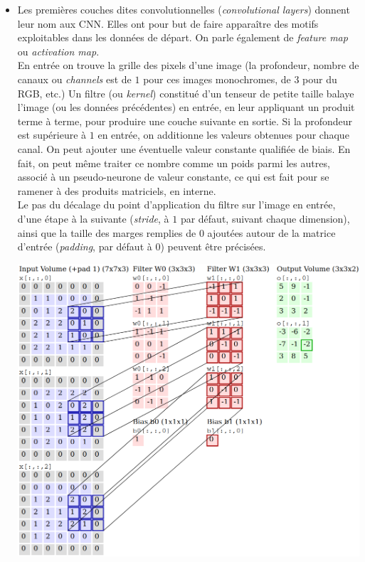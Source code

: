 \documentclass[a4paper,11pt]{article} %
\begin{document}
\begin{itemize}
	\item
	Les premières couches dites convolutionnelles (\emph{convolutional layers}) donnent leur nom aux CNN. Elles ont pour but de \og faire apparaître\fg{} des motifs exploitables dans les données de départ. On parle également de \emph{feature map} ou \emph{activation map}.\\
	En entrée on trouve la grille des pixels d'une image (la \og profondeur\fg{}, nombre de canaux ou \emph{channels} est de $1$ pour ces images monochromes, de $3$ pour du RGB, etc.) Un filtre (ou \emph{kernel}) constitué d'un tenseur de petite taille balaye l'image (ou les données précédentes) en entrée, en leur appliquant un produit terme à terme, pour produire une couche suivante en sortie. Si la profondeur est supérieure à $1$ en entrée, on additionne les valeurs obtenues pour chaque canal. On peut ajouter une éventuelle valeur constante qualifiée de biais. En fait, on peut même traiter ce nombre comme un poids parmi les autres, associé à un pseudo-neurone de valeur constante, ce qui est fait pour se ramener à des produits matriciels, en interne.\\
	Le pas du décalage du point d'application du filtre sur l'image en entrée, d'une étape à la suivante (\emph{stride}, à $1$ par défaut, suivant chaque dimension), ainsi que la taille des marges remplies de $0$ ajoutées autour de la matrice d'entrée (\emph{padding}, par défaut à $0$) peuvent être précisées.
	\begin{center}
		\includegraphics[width=\linewidth]{convolution.png}

\end{center}
\end{itemize}
\end{document}
